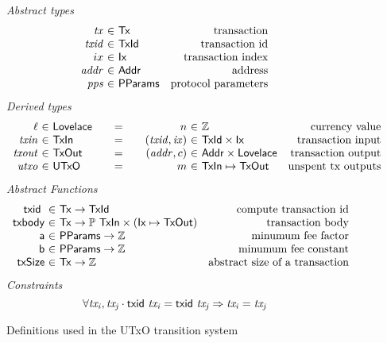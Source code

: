 \begin{figure*}[htb]
  \emph{Abstract types}
  \begin{equation*}
    \begin{array}{r@{~\in~}lr}
      \var{tx} & \Tx & \text{transaction}\\
      \var{txid} & \TxId & \text{transaction id}\\
      ix & \Ix & \text{transaction index}\\
      \var{addr} & \Addr & \text{address}\\
      \var{pps} & \PPMMap & \text{protocol parameters}
    \end{array}
  \end{equation*}
  \emph{Derived types}
  \begin{equation*}
    \begin{array}{r@{~\in~}l@{\qquad=\qquad}r@{~\in~}lr}
      \ell & \Lovelace
      & n  & \mathbb{Z}
      & \text{currency value}
      \\
      \var{txin}
      & \TxIn
      & (\var{txid}, \var{ix})
      & \TxId \times \Ix
      & \text{transaction input}
      \\
      \var{txout}
      & \type{TxOut}
      & (\var{addr}, c)
      & \Addr \times \Lovelace
      & \text{transaction output}
      \\
      \var{utxo}
      & \UTxO
      & m
      & \TxIn \mapsto \TxOut
      & \text{unspent tx outputs}
    \end{array}
  \end{equation*}
  \emph{Abstract Functions}
  \begin{equation*}
    \begin{array}{r@{~\in~}lr}
      \txid{} & \Tx \to \TxId & \text{compute transaction id}\\
      \fun{txbody} & \Tx \to \powerset{\TxIn} \times (\Ix \mapsto \TxOut)
                                  & \text{transaction body}\\
      \fun{a} & \PPMMap \to \mathbb{Z} & \text{minumum fee factor}\\
      \fun{b} & \PPMMap \to \mathbb{Z} & \text{minumum fee constant}\\
      \fun{txSize} & \Tx \to \mathbb{Z} & \text{abstract size of a transaction}
    \end{array}
  \end{equation*}
  \emph{Constraints}
  \begin{equation}
    \label{eq:txid-injective}
    \forall \mathit{tx_i}, \mathit{tx_j} \cdot
    \mathsf{txid}~ \mathit{\mathit{tx_i}} = \mathsf{txid}~ \mathit{\mathit{tx_j}} \Rightarrow \mathit{tx_i} = \mathit{tx_j}
  \end{equation}
  \caption{Definitions used in the UTxO transition system}
  \label{fig:defs:utxo}
\end{figure*}


